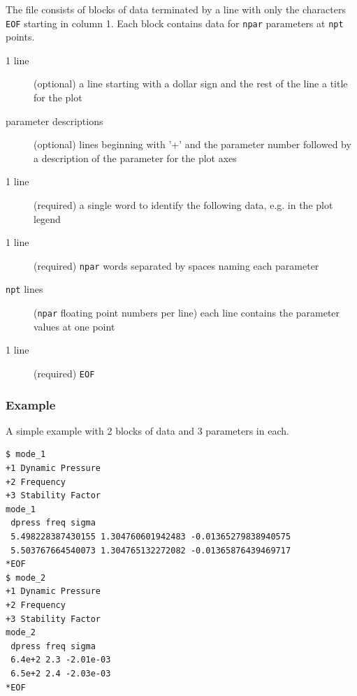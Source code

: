\documentclass[10pt,openany,twoside]{book}
\numberwithin{equation}{section}   %
\newcommand{\Code}[1]{{\small\tt #1}}
\begin{document}
The file consists of blocks of data terminated by a line with
only the characters \Code{*EOF} starting in column 1. Each block
contains data for \Code{npar} parameters at \Code{npt} points.
\begin{description}
	\item[1 line] (optional) a line starting with a dollar sign and
		the rest of the line a title for the plot 
	\item[parameter descriptions] (optional) lines beginning with '+' and the parameter number
			followed by a description of the parameter for the plot axes
	\item[1 line] (required) a single word to identify the following
			data, e.g. in the plot legend
	\item[1 line] (required) \Code{npar} words separated by spaces naming each
			parameter
	\item[\Code{npt} lines] (\Code{npar} floating point numbers per line)
			each line contains the parameter values at one point
	\item[1 line] (required) \Code{*EOF}
\end{description}

\subsubsection{Example} A simple example with 2 blocks of data and
3 parameters in each.
\begin{lstlisting}
$ mode_1
+1 Dynamic Pressure
+2 Frequency
+3 Stability Factor
mode_1
 dpress freq sigma
 5.498228387430155 1.304760601942483 -0.01365279838940575
 5.503767664540073 1.304765132272082 -0.01365876439469717
*EOF
$ mode_2
+1 Dynamic Pressure
+2 Frequency
+3 Stability Factor
mode_2
 dpress freq sigma
 6.4e+2 2.3 -2.01e-03
 6.5e+2 2.4 -2.03e-03
*EOF
\end{lstlisting}
\end{document}
